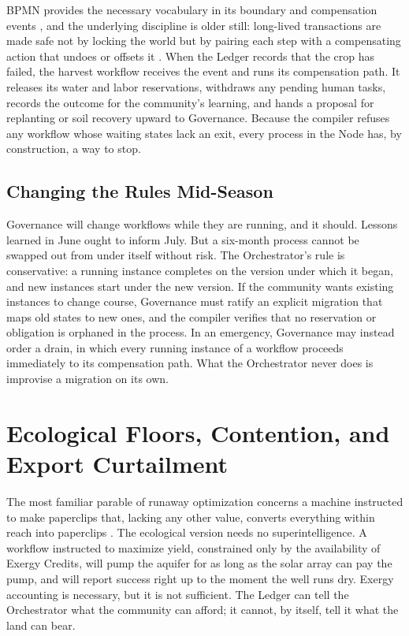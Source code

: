 BPMN provides the necessary vocabulary in its boundary and compensation events \parencite{omg2011bpmn}, and the underlying discipline is older still: long-lived transactions are made safe not by locking the world but by pairing each step with a compensating action that undoes or offsets it \parencite{garciamolina1987sagas}. When the Ledger records that the crop has failed, the harvest workflow receives the event and runs its compensation path. It releases its water and labor reservations, withdraws any pending human tasks, records the outcome for the community's learning, and hands a proposal for replanting or soil recovery upward to Governance. Because the compiler refuses any workflow whose waiting states lack an exit, every process in the Node has, by construction, a way to stop.

\subsection{Changing the Rules Mid-Season}

Governance will change workflows while they are running, and it should. Lessons learned in June ought to inform July. But a six-month process cannot be swapped out from under itself without risk. The Orchestrator's rule is conservative: a running instance completes on the version under which it began, and new instances start under the new version. If the community wants existing instances to change course, Governance must ratify an explicit migration that maps old states to new ones, and the compiler verifies that no reservation or obligation is orphaned in the process. In an emergency, Governance may instead order a drain, in which every running instance of a workflow proceeds immediately to its compensation path. What the Orchestrator never does is improvise a migration on its own.

\section{Ecological Floors, Contention, and Export Curtailment}

The most familiar parable of runaway optimization concerns a machine instructed to make paperclips that, lacking any other value, converts everything within reach into paperclips \parencite{bostrom2014}. The ecological version needs no superintelligence. A workflow instructed to maximize yield, constrained only by the availability of Exergy Credits, will pump the aquifer for as long as the solar array can pay the pump, and will report success right up to the moment the well runs dry. Exergy accounting is necessary, but it is not sufficient. The Ledger can tell the Orchestrator what the community can afford; it cannot, by itself, tell it what the land can bear.

